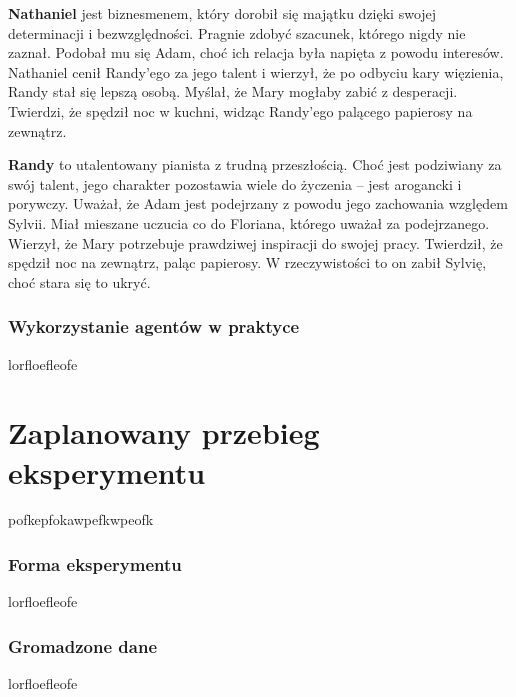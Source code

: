 \textbf{Nathaniel} jest biznesmenem, który dorobił się majątku dzięki swojej determinacji i bezwzględności.
Pragnie zdobyć szacunek, którego nigdy nie zaznał. Podobał mu się Adam, choć ich relacja była
napięta z powodu interesów. Nathaniel cenił Randy'ego za jego talent i wierzył, że po odbyciu kary
więzienia, Randy stał się lepszą osobą. Myślał, że Mary mogłaby zabić z desperacji. Twierdzi, że
spędził noc w kuchni, widząc Randy'ego palącego papierosy na zewnątrz.

\textbf{Randy} to utalentowany pianista z trudną przeszłością. Choć jest podziwiany za swój talent, jego
charakter pozostawia wiele do życzenia – jest arogancki i porywczy. Uważał, że Adam jest podejrzany
z powodu jego zachowania względem Sylvii. Miał mieszane uczucia co do Floriana, którego uważał za
podejrzanego. Wierzył, że Mary potrzebuje prawdziwej inspiracji do swojej pracy. Twierdził, że
spędził noc na zewnątrz, paląc papierosy. W rzeczywistości to on zabił Sylvię, choć stara się to
ukryć.

\subsubsection*{Wykorzystanie agentów w praktyce}

lorfloefleofe

\section{Zaplanowany przebieg eksperymentu}\label{section:ch4_3}

pofkepfokawpefkwpeofk

\subsubsection*{Forma eksperymentu}

lorfloefleofe

\subsubsection*{Gromadzone dane}

lorfloefleofe